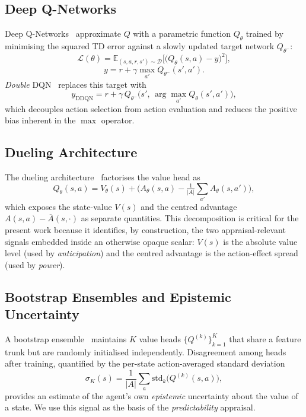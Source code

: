 \documentclass[conference]{IEEEtran}
\begin{document}
\subsection{Deep Q-Networks}
Deep Q-Networks~\cite{mnih2015human} approximate $Q$ with a parametric function
$Q_{\theta}$ trained by minimising the squared TD error against a slowly
updated target network $Q_{\theta^{-}}$:
\begin{equation}
\mathcal{L}(\theta) =
\mathbb{E}_{(s, a, r, s') \sim \mathcal{D}}
\Big[ \big( Q_{\theta}(s, a) - y \big)^{2} \Big],
\end{equation}
\begin{equation}
y = r + \gamma \max_{a'} Q_{\theta^{-}}(s', a').
\end{equation}
\textit{Double} DQN~\cite{vanhasselt2016double} replaces this target with
\begin{equation}
y_{\mathrm{DDQN}} = r + \gamma\, Q_{\theta^{-}}\!\big(s',\, \arg\max_{a'} Q_{\theta}(s', a')\big),
\end{equation}
which decouples action selection from action evaluation and reduces the
positive bias inherent in the $\max$ operator.

\subsection{Dueling Architecture}
The dueling architecture~\cite{wang2016dueling} factorises the value head as
\begin{equation}
Q_{\theta}(s, a) = V_{\theta}(s) + \Big( A_{\theta}(s, a) - \tfrac{1}{|A|} \sum_{a'} A_{\theta}(s, a') \Big),
\label{eq:dueling}
\end{equation}
which exposes the state-value $V(s)$ and the centred advantage $A(s, a) -
\overline{A}(s, \cdot)$ as separate quantities. This decomposition is critical
for the present work because it identifies, by construction, the two
appraisal-relevant signals embedded inside an otherwise opaque scalar:
$V(s)$ is the absolute value level (used by \emph{anticipation}) and the
centred advantage is the action-effect spread (used by \emph{power}).

\subsection{Bootstrap Ensembles and Epistemic Uncertainty}
A bootstrap ensemble~\cite{osband2016deepexploration} maintains $K$ value heads
$\{Q^{(k)}\}_{k=1}^{K}$ that share a feature trunk but are randomly initialised
independently. Disagreement among heads after training, quantified by the
per-state action-averaged standard deviation
\begin{equation}
\sigma_{K}(s) = \frac{1}{|A|} \sum_{a} \mathrm{std}_{k}\big(Q^{(k)}(s, a)\big),
\label{eq:qstd}
\end{equation}
provides an estimate of the agent's own \emph{epistemic} uncertainty about the
value of a state. We use this signal as the basis of the \emph{predictability}
appraisal.
\end{document}
